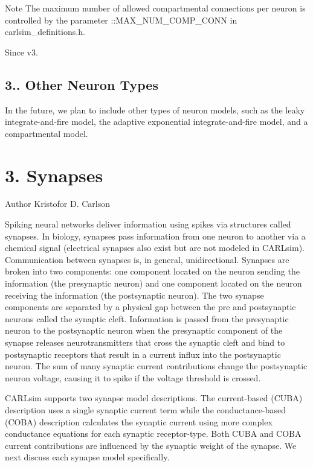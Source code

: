\begin{DoxyNote}{Note}
The maximum number of allowed compartmental connections per neuron is controlled by the parameter \+::\+M\+A\+X\+\_\+\+N\+U\+M\+\_\+\+C\+O\+M\+P\+\_\+\+C\+O\+NN in carlsim\+\_\+definitions.\+h. 
\end{DoxyNote}
\begin{DoxySince}{Since}
v3.
\end{DoxySince}
\hypertarget{ch3_neurons_synapses_groups_ch3s1s4_other_neurons}{}\subsection{3.. Other Neuron Types}\label{ch3_neurons_synapses_groups_ch3s1s4_other_neurons}
In the future, we plan to include other types of neuron models, such as the leaky integrate-\/and-\/fire model, the adaptive exponential integrate-\/and-\/fire model, and a compartmental model.\hypertarget{ch3_neurons_synapses_groups_ch3s2_synapses}{}\section{3. Synapses}\label{ch3_neurons_synapses_groups_ch3s2_synapses}
\begin{DoxyAuthor}{Author}
Kristofor D. Carlson
\end{DoxyAuthor}
Spiking neural networks deliver information using spikes via structures called synapses. In biology, synapses pass information from one neuron to another via a chemical signal (electrical synapses also exist but are not modeled in C\+A\+R\+Lsim). Communication between synapses is, in general, unidirectional. Synapses are broken into two components\+: one component located on the neuron sending the information (the presynaptic neuron) and one component located on the neuron receiving the information (the postsynaptic neuron). The two synapse components are separated by a physical gap between the pre and postsynaptic neurons called the synaptic cleft. Information is passed from the presynaptic neuron to the postsynaptic neuron when the presynaptic component of the synapse releases neurotransmitters that cross the synaptic cleft and bind to postsynaptic receptors that result in a current influx into the postsynaptic neuron. The sum of many synaptic current contributions change the postsynaptic neuron voltage, causing it to spike if the voltage threshold is crossed.

C\+A\+R\+Lsim supports two synapse model descriptions. The current-\/based (C\+U\+BA) description uses a single synaptic current term while the conductance-\/based (C\+O\+BA) description calculates the synaptic current using more complex conductance equations for each synaptic receptor-\/type. Both C\+U\+BA and C\+O\+BA current contributions are influenced by the synaptic weight of the synapse. We next discuss each synapse model specifically.

